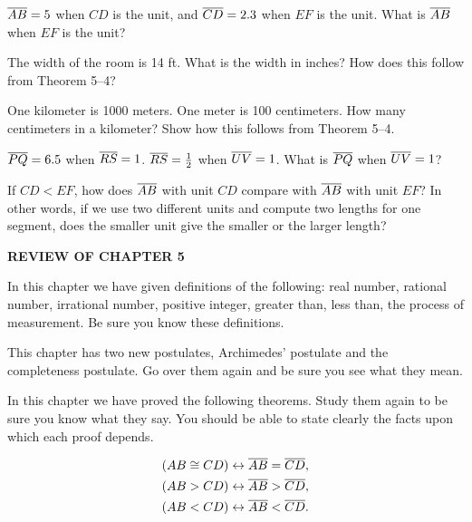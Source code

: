 \documentclass[11pt]{book}
\newcommand{\Vhead}[1]{%
  \par\bigskip\begin{center}\bfseries\large\MakeUppercase{#1}\end{center}%
  \par\nopagebreak\medskip}
\begin{document}
\begin{exercisecols}
\begin{exlist}
\item $\overline{AB} = 5$ when $CD$ is the unit, and $\overline{CD} = 2.3$ when $EF$ is the
      unit. What is $\overline{AB}$ when $EF$ is the unit?
\item The width of the room is 14 ft. What is the width in inches? How does
      this follow from Theorem 5--4?
\item One kilometer is 1000 meters. One meter is 100 centimeters. How many
      centimeters in a kilometer? Show how this follows from Theorem 5--4.
\item $\overline{PQ} = 6.5$ when $\overline{RS} = 1$. $\overline{RS} = \frac{1}{2}$ when
      $\overline{UV} = 1$. What is $\overline{PQ}$ when $\overline{UV} = 1$?
\item If $CD < EF$, how does $\overline{AB}$ with unit $CD$ compare with $\overline{AB}$
      with unit $EF$? In other words, if we use two different units and compute
      two lengths for one segment, does the smaller unit give the smaller or
      the larger length?
\end{exlist}

\Vhead{Review of Chapter 5}

\begin{exlist}
\item In this chapter we have given definitions of the following: real number,
      rational number, irrational number, positive integer, greater than, less
      than, the process of measurement. Be sure you know these definitions.
\item This chapter has two new postulates, Archimedes' postulate and the
      completeness postulate. Go over them again and be sure you see what they
      mean.
\item In this chapter we have proved the following theorems. Study them again
      to be sure you know what they say. You should be able to state clearly
      the facts upon which each proof depends.
\end{exlist}

\begin{align*}
(AB \cong CD) &\leftrightarrow \overline{AB} = \overline{CD},\\
(AB > CD) &\leftrightarrow \overline{AB} > \overline{CD},\\
(AB < CD) &\leftrightarrow \overline{AB} < \overline{CD}.
\end{align*}


\end{exercisecols}
\end{document}
